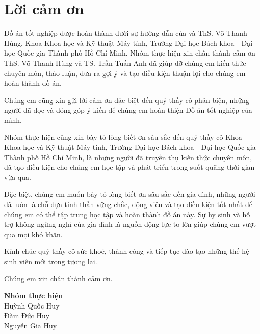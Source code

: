 \section*{Lời cảm ơn}
\thispagestyle{empty}

Đồ án tốt nghiệp được hoàn thành dưới sự hướng dẫn của và ThS. Võ Thanh Hùng, Khoa Khoa học và Kỹ thuật Máy tính, Trường Đại học Bách khoa - Đại học Quốc gia Thành phố Hồ Chí Minh. Nhóm thực hiện xin chân thành cảm ơn ThS. Võ Thanh Hùng và TS. Trần Tuấn Anh đã giúp đỡ chúng em kiến thức chuyên môn, thảo luận, đưa ra gợi ý và tạo điều kiện thuận lợi cho chúng em hoàn thành đồ án.

Chúng em cũng xin gửi lời cảm ơn đặc biệt đến quý thầy cô phản biện, những người đã đọc và đóng góp ý kiến để chúng em hoàn thiện Đồ án tốt nghiệp của mình.

Nhóm thực hiện cũng xin bày tỏ lòng biết ơn sâu sắc đến quý thầy cô Khoa Khoa học và Kỹ thuật Máy tính, Trường Đại học Bách khoa - Đại học Quốc gia Thành phố Hồ Chí Minh, là những người đã truyền thụ kiến thức chuyên môn, đã tạo điều kiện cho chúng em học tập và phát triển trong suốt quãng thời gian vừa qua.

Đặc biệt, chúng em muốn bày tỏ lòng biết ơn sâu sắc đến gia đình, những người đã luôn là chỗ dựa tinh thần vững chắc, động viên và tạo điều kiện tốt nhất để chúng em có thể tập trung học tập và hoàn thành đồ án này. Sự hy sinh và hỗ trợ không ngừng nghỉ của gia đình là nguồn động lực to lớn giúp chúng em vượt qua mọi khó khăn.

Kính chúc quý thầy cô sức khoẻ, thành công và tiếp tục đào tạo những thế hệ sinh viên mới trong tương lai.

Chúng em xin chân thành cảm ơn.

\vspace{2cm} %

\begin{flushright} %
    \textbf{Nhóm thực hiện} \\[0.5cm] 
    
    Huỳnh Quốc Huy \\[0.2cm]
    Đàm Đức Huy \\[0.2cm]
    Nguyễn Gia Huy
\end{flushright}

\clearpage
{}
